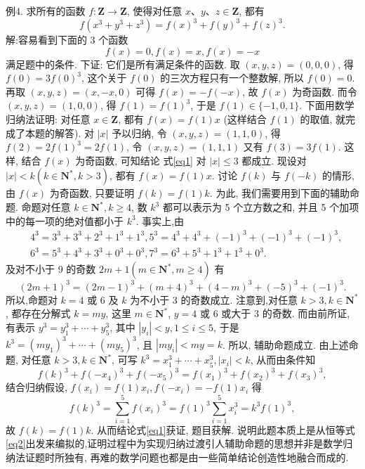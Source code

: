 例4. 求所有的函数 $f: \mathbf{Z} \rightarrow \mathbf{Z}$, 使得对任意 $x 、 y 、 z \in \mathbf{Z}$, 都有
$$
f\left(x^3+y^3+z^3\right)=f(x)^3+f(y)^3+f(z)^3 .
$$
解:容易看到下面的 3 个函数
$$
f(x)=0, f(x)=x, f(x)=-x
$$
满足题中的条件.
下证: 它们是所有满足条件的函数.
取 $(x, y, z)=(0,0,0)$, 得 $f(0)=3 f(0)^3$, 这个关于 $f(0)$ 的三次方程只有一个整数解, 所以 $f(0)=0$. 再取 $(x, y, z)=(x,-x, 0)$ 可得 $f(x)= -f(-x)$, 故 $f(x)$ 为奇函数.
而令 $(x, y, z)=(1,0,0)$, 得 $f(1)=f(1)^3$, 于是 $f(1) \in\{-1,0,1\}$.
下面用数学归纳法证明:
对任意 $x \in \mathbf{Z}$, 都有 $f(x)=f(1) x$ (这样结合 $f(1)$ 的取值, 就完成了本题的解答). \label{eq1}
对 $|x|$ 予以归纳, 令 $(x, y, z)=(1,1,0)$, 得 $f(2)=2 f(1)^3=2 f(1)$, 令 $(x, y, z)=(1,1,1)$ 又有 $f(3)=3 f(1)$. 这样, 结合 $f(x)$ 为奇函数, 可知结论 式\ref{eq1} 对 $|x| \leqslant 3$ 都成立.
现设对 $|x|<k\left(k \in \mathbf{N}^*, k>3\right)$, 都有 $f(x)=f(1) x$. 讨论 $f(k)$ 与 $f(-k)$ 的情形, 由 $f(x)$ 为奇函数, 只要证明 $f(k)=f(1) k$.
为此, 我们需要用到下面的辅助命题.
命题对任意 $k \in \mathbf{N}^*, k \geqslant 4$, 数 $k^3$ 都可以表示为 5 个立方数之和, 并且 5 个加项中的每一项的绝对值都小于 $k^3$.
事实上,由
$$
\begin{aligned}
& 4^3=3^3+3^3+2^3+1^3+1^3, 5^3=4^3+4^3+(-1)^3+(-1)^3+(-1)^3, \\
& 6^3=5^3+4^3+3^3+0^3+0^3, 7^3=6^3+5^3+1^3+1^3+0^3 .
\end{aligned}
$$
及对不小于 9 的奇数 $2 m+1\left(m \in \mathbf{N}^*, m \geqslant 4\right)$ 有
$$
(2 m+1)^3=(2 m-1)^3+(m+4)^3+(4-m)^3+(-5)^3+(-1)^3 . \label{eq2}
$$
所以,命题对 $k=4$ 或 6 及 $k$ 为不小于 3 的奇数成立.
注意到,对任意 $k>3, k \in \mathbf{N}^*$, 都存在分解式 $k=m y$, 这里 $m \in \mathbf{N}^*$, $y=4$ 或 6 或大于 3 的奇数.
而由前所证,有表示 $y^3=y_1^3+\cdots+y_5^3$, 其中 $\left|y_i\right|<y, 1 \leqslant i \leqslant 5$, 于是 $k^3=\left(m y_1\right)^3+\cdots+\left(m y_5\right)^3$, 且 $\left|m y_i\right|<m y=k$. 所以, 辅助命题成立.
由上述命题, 对任意 $k>3, k \in \mathbf{N}^*$, 可写 $k^3=x_1^3+\cdots+x_5^3,\left|x_i\right|<k$, 从而由条件知
$$
f(k)^3+f\left(-x_4\right)^3+f\left(-x_5\right)^3=f\left(x_1\right)^3+f\left(x_2\right)^3+f\left(x_3\right)^3,
$$
结合归纳假设, $f\left(x_i\right)=f(1) x_i, f\left(-x_i\right)=-f(1) x_i$ 得
$$
f(k)^3=\sum_{i=1}^5 f\left(x_i\right)^3=f(1)^3 \sum_{i=1}^5 x_i^3=k^3 f(1)^3,
$$
故 $f(k)=f(1) k$.
从而结论式\ref{eq1}获证, 题目获解.
说明此题本质上是从恒等式\ref{eq2}出发来编拟的,证明过程中为实现归纳过渡引人辅助命题的思想并非是数学归纳法证题时所独有, 再难的数学问题也都是由一些简单结论创造性地融合而成的.




